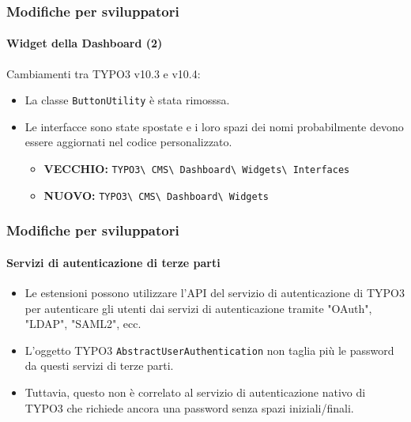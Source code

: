 \begin{frame}[fragile]
	\frametitle{Modifiche per sviluppatori}
	\framesubtitle{Widget della Dashboard (2)}

	Cambiamenti tra TYPO3 v10.3 e v10.4:

	\begin{itemize}
		\item La classe \texttt{ButtonUtility} è stata rimosssa.
		\item Le interfacce sono state spostate e i loro spazi dei nomi probabilmente
		    devono essere aggiornati nel codice personalizzato.
			\begin{itemize}\smaller
				\item \textbf{VECCHIO:}
					\texttt{TYPO3\textbackslash
						CMS\textbackslash
						Dashboard\textbackslash
						Widgets\textbackslash
						Interfaces}
				\item \textbf{NUOVO:}
					\texttt{TYPO3\textbackslash
						CMS\textbackslash
						Dashboard\textbackslash
						Widgets}
			\end{itemize}\normalsize
	\end{itemize}

\end{frame}


\begin{frame}[fragile]
	\frametitle{Modifiche per sviluppatori}
	\framesubtitle{Servizi di autenticazione di terze parti}

	\begin{itemize}

		\item Le estensioni possono utilizzare l'API del servizio di autenticazione di TYPO3
		    per autenticare gli utenti dai servizi di autenticazione tramite "OAuth", "LDAP", "SAML2", ecc.
		\item L'oggetto TYPO3 \texttt{AbstractUserAuthentication} non taglia più le password da questi servizi di terze parti.
		\item Tuttavia, questo non è correlato al servizio di autenticazione nativo di TYPO3 che richiede ancora una password
		    senza spazi iniziali/finali.

	\end{itemize}

\end{frame}

